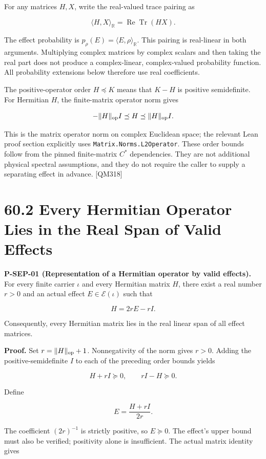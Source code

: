 \documentclass[
  11pt,
  oneside]{book}
\begin{document}
For any matrices \(H,X\), write the real-valued trace pairing as

\[
\langle H,X\rangle_{\mathbb R}
=\operatorname{Re}\operatorname{Tr}(HX).
\]

The effect probability is
\(p_\rho(E)=\langle E,\rho\rangle_{\mathbb R}\). This pairing is
real-linear in both arguments. Multiplying complex matrices by complex
scalars and then taking the real part does not produce a complex-linear,
complex-valued probability function. All probability extensions below
therefore use real coefficients.

The positive-operator order \(H\preceq K\) means that \(K-H\) is
positive semidefinite. For Hermitian \(H\), the finite-matrix operator
norm gives

\[
-\|H\|_{\rm op}I\preceq H\preceq\|H\|_{\rm op}I.
\]

This is the matrix operator norm on complex Euclidean space; the
relevant Lean proof section explicitly uses
\texttt{Matrix.\allowbreak Norms.\allowbreak L2\allowbreak Operator}. These order bounds follow from the
pinned finite-matrix \(C^*\) dependencies. They are not additional
physical spectral assumptions, and they do not require the caller to
supply a separating effect in advance. {[}QM318{]}

\section{60.2 Every Hermitian Operator Lies in the Real Span of Valid
Effects}

\label{p-sep-01}{}

\textbf{P-SEP-01 (Representation of a Hermitian operator by valid
effects).} For every finite carrier \(\iota\) and every Hermitian matrix
\(H\), there exist a real number \(r>0\) and an actual effect
\(E\in\mathcal E(\iota)\) such that

\[
H=2rE-rI.
\]

Consequently, every Hermitian matrix lies in the real linear span of all
effect matrices.

\textbf{Proof.} Set \(r=\|H\|_{\rm op}+1\). Nonnegativity of the norm
gives \(r>0\). Adding the positive-semidefinite \(I\) to each of the
preceding order bounds yields

\[
H+rI\succeq0,\qquad rI-H\succeq0.
\]

Define

\[
E=\frac{H+rI}{2r}.
\]

The coefficient \((2r)^{-1}\) is strictly positive, so \(E\succeq0\).
The effect's upper bound must also be verified; positivity alone is
insufficient. The actual matrix identity gives
\end{document}
